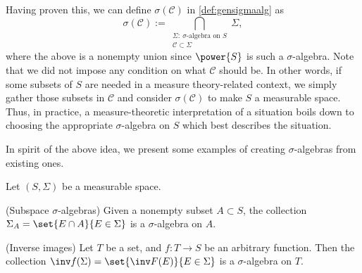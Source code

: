 Having proven this,
we can define \(\sigma(\mathcal C)\) in \cref{def:gensigmaalg} as
\[
    \sigma(\mathcal C)
    :=\bigcap_{\substack{
        \Sigma:\ \text{\(\sigma\)-algebra on \(S\)} \\
        \mathcal C\subset\Sigma}}\Sigma,
\]
where the above is a nonempty union since
\(\power{S}\) is such a \(\sigma\)-algebra.
Note that
we did not impose any condition on what \(\mathcal C\) should be.
In other words,
if some subsets of \(S\) are needed in a measure theory-related context,
we simply gather those subsets in \(\mathcal C\)
and consider \(\sigma(\mathcal C)\) to make \(S\) a measurable space.
Thus, in practice, a measure-theoretic interpretation of a situation
boils down to choosing the appropriate \(\sigma\)-algebra on \(S\)
which best describes the situation.

In spirit of the above idea,
we present some examples of creating \(\sigma\)-algebras
from existing ones.
\begin{proposition}
    \label{prop:sigmaalg}
    Let \((S,\Sigma)\) be a measurable space.
    \begin{alist}
        \item (Subspace \(\sigma\)-algebras)
        Given a nonempty subset \(A\subset S\),
        the collection \(\Sigma_A=\set{E\cap A}{E\in\Sigma}\)
        is a \(\sigma\)-algebra on \(A\).
        \item (Inverse images)
        Let \(T\) be a set,
        and \(f:T\to S\) be an arbitrary function.
        Then the collection
        \(\inv f(\Sigma)=\set{\inv F(E)}{E\in\Sigma}\)
        is a \(\sigma\)-algebra on \(T\).
    \end{alist}
\end{proposition}
